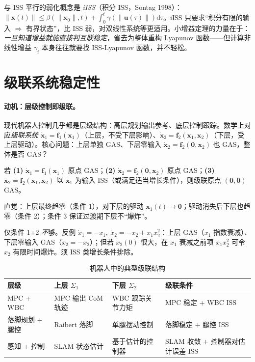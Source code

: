 \noindent 与 ISS 平行的弱化概念是 \emph{iISS}（积分 ISS，Sontag 1998\cite{sontag1998mathematical}）：$\|\mathbf{x}(t)\|\le\beta(\|\mathbf{x}_0\|,t)+\int_0^t\gamma(\|\mathbf{u}(\tau)\|)\mathrm d\tau$。iISS 只要求“积分有限的输入 $\Rightarrow$ 有界状态”，比 ISS 弱，对双线性系统等更适用。小增益定理的力量在于：\emph{一旦知道增益就能直接判互联稳定}，省去为整体重构 Lyapunov 函数——但计算非线性增益 $\gamma_i$ 本身往往就要找 ISS-Lyapunov 函数，并不轻松。

\section{级联系统稳定性}
\label{sec:lyap-cascade}

\paragraph{动机：层级控制即级联。}
现代机器人控制几乎都是层级结构：高层规划输出参考、底层控制跟踪。数学上对应\emph{级联系统} $\dot{\mathbf{x}}_1=\mathbf{f}_1(\mathbf{x}_1)$（上层，不受下层影响）、$\dot{\mathbf{x}}_2=\mathbf{f}_2(\mathbf{x}_1,\mathbf{x}_2)$（下层，受上层驱动）。核心问题：上层单独 GAS、下层零输入 $\dot{\mathbf{x}}_2=\mathbf{f}_2(\mathbf{0},\mathbf{x}_2)$ 也 GAS，整体是否 GAS？

\begin{theorem}
\label{thm:lyap-cascade}
若 \textbf{(1)} $\dot{\mathbf{x}}_1=\mathbf{f}_1(\mathbf{x}_1)$ 原点 GAS；\textbf{(2)} $\dot{\mathbf{x}}_2=\mathbf{f}_2(\mathbf{0},\mathbf{x}_2)$ 原点 GAS；\textbf{(3)} $\dot{\mathbf{x}}_2=\mathbf{f}_2(\mathbf{x}_1,\mathbf{x}_2)$ 以 $\mathbf{x}_1$ 为输入 ISS（或满足适当增长条件），则级联原点 $(\mathbf{0},\mathbf{0})$ GAS。
\end{theorem}

\noindent 直觉：上层最终趋零（条件 1），对下层的驱动 $\mathbf{x}_1(t)\to\mathbf{0}$；驱动消失后下层也趋零（条件 2）；条件 3 保证过渡期下层不“爆炸”。

\begin{pitfall}
仅条件 1+2 \emph{不}够。反例 $\dot x_1=-x_1,\ \dot x_2=-x_2+x_1x_2^2$：上层 GAS（$x_1$ 指数衰减）、下层零输入 GAS（$\dot x_2=-x_2$）；但若 $x_2(0)$ 很大，在 $x_1$ 衰减之前项 $x_1x_2^2$ 可令 $x_2$ 有限时间爆炸。须 ISS 类增长条件排除。
\end{pitfall}

\begin{table}[H]\centering\small
\caption{机器人中的典型级联结构}
\label{tab:lyap-cascade}
\begin{tabular}{llll}
\toprule
层级 & 上层 $\Sigma_1$ & 下层 $\Sigma_2$ & 级联条件 \\
\midrule
MPC + WBC & MPC 输出 CoM 轨迹 & WBC 跟踪关节力矩 & MPC 稳定 + WBC ISS \\
落脚规划 + 腿控 & Raibert 落脚 & 单腿摆动控制 & 落脚稳定 + 腿控 ISS \\
感知 + 控制 & SLAM 状态估计 & 基于估计的控制器 & SLAM 收敛 + 控制器对估计误差 ISS \\
\bottomrule
\end{tabular}
\end{table}

